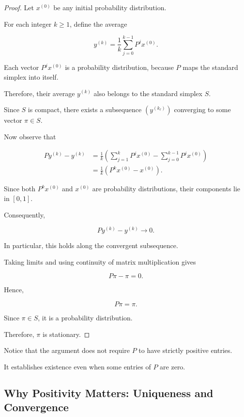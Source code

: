 \documentclass[11pt,a4paper]{article}
\theoremstyle{definition}
\theoremstyle{remark}
\begin{document}
\begin{proof}

Let $x^{(0)}$ be any initial
probability distribution.

For each integer $k\geq1$,
define the average

\[
y^{(k)}
=
\frac{1}{k}
\sum_{j=0}^{k-1}P^jx^{(0)}.
\]

Each vector $P^jx^{(0)}$
is a probability distribution,
because $P$ maps the
standard simplex into itself.

Therefore, their average
$y^{(k)}$ also belongs
to the standard simplex $S$.

Since $S$ is compact,
there exists a subsequence
$(y^{(k_\ell)})$ converging
to some vector $\pi\in S$.

Now observe that

\[
\begin{aligned}
Py^{(k)}-y^{(k)}
&=
\frac{1}{k}
\left(
\sum_{j=1}^{k}P^jx^{(0)}
-
\sum_{j=0}^{k-1}P^jx^{(0)}
\right)\\
&=
\frac{1}{k}
\left(
P^kx^{(0)}-x^{(0)}
\right).
\end{aligned}
\]

Since both $P^kx^{(0)}$
and $x^{(0)}$ are
probability distributions,
their components lie in $[0,1]$.

Consequently,

\[
Py^{(k)}-y^{(k)}
\longrightarrow0.
\]

In particular, this holds
along the convergent
subsequence.

Taking limits and using
continuity of matrix
multiplication gives

\[
P\pi-\pi=0.
\]

Hence,

\[
\boxed{P\pi=\pi.}
\]

Since $\pi\in S$,
it is a probability distribution.

Therefore, $\pi$ is stationary.

\end{proof}

Notice that the argument
does not require $P$ to
have strictly positive entries.

It establishes existence
even when some entries
of $P$ are zero.

\subsection{Why Positivity Matters:
Uniqueness and Convergence}
\end{document}

